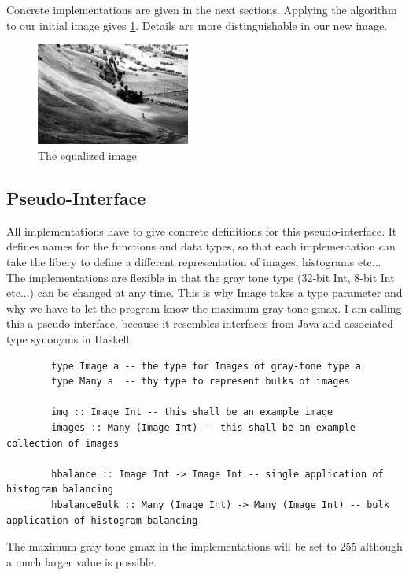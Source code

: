 \documentclass{article}
\begin{document}
      Concrete implementations are given in the next sections.
      Applying the algorithm to our initial image gives \ref{fig:img-eq}. Details are more distinguishable in our new image.
      
      \begin{figure}[h]
        \centering
        \includegraphics[width=0.45\textwidth]{img-eq}
        \caption{ The equalized image }
        \label{fig:img-eq}
      \end{figure}
      
    \subsection{Pseudo-Interface}
      All implementations have to give concrete definitions for this pseudo-interface.
      It defines names for the functions and data types, so that each implementation
      can take the libery to define a different representation of images, histograms etc...
      The implementations are flexible in that the gray tone type (32-bit Int, 8-bit Int etc...)
      can be changed at any time. This is why Image takes a type parameter and why we have to
      let the program know the maximum gray tone gmax. I am calling this a pseudo-interface,
      because it resembles interfaces from Java and associated type synonyms in Haskell.
      \begin{lstlisting}
        type Image a -- the type for Images of gray-tone type a
        type Many a  -- thy type to represent bulks of images

        img :: Image Int -- this shall be an example image
        images :: Many (Image Int) -- this shall be an example collection of images
        
        hbalance :: Image Int -> Image Int -- single application of histogram balancing
        hbalanceBulk :: Many (Image Int) -> Many (Image Int) -- bulk application of histogram balancing
      \end{lstlisting}
      
      The maximum gray tone gmax in the implementations will be set to 255 although
      a much larger value is possible.
    
\end{document}
